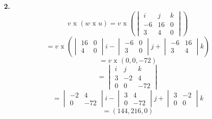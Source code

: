 \documentclass{article}
\begin{document}
   \textbf{2.}
   $$v \text{ x }(w \text{ x } u) = v \text{ x }\left(\begin{vmatrix}
       i & j & k \\
       -6 & 16 & 0 \\
       3 & 4 & 0
   \end{vmatrix}\right)$$
   $$= v \text{ x } \left(\begin{vmatrix}
       16 & 0 \\
       4 & 0
   \end{vmatrix}i - \begin{vmatrix}
       -6 & 0 \\
       3 & 0
   \end{vmatrix}j + \begin{vmatrix}
       -6 & 16 \\
       3 & 4
   \end{vmatrix}k\right)$$
   $$= v \text{ x } (0, 0, -72)$$
   $$ = \begin{vmatrix}
       i & j & k \\
       3 &  -2 & 4 \\ 
       0 &  0 &  -72  
   \end{vmatrix}$$
   $$= \begin{vmatrix}
       -2 & 4 \\
       0 & -72
   \end{vmatrix}i- \begin{vmatrix}
       3 & 4 \\
       0 & -72
   \end{vmatrix}j+\begin{vmatrix}
       3 & -2 \\
       0 & 0
   \end{vmatrix}k$$
   $$=(144, 216, 0)$$
\end{document}
